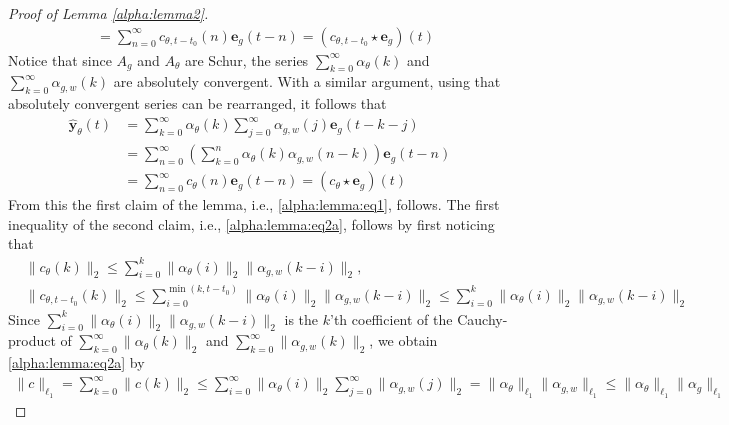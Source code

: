 \documentclass{article}
\newcommand{\e}{\mathbf{e}}
\newcommand{\y}{\mathbf{y}}
\begin{document}
\begin{proof}[Proof of Lemma  \ref{alpha:lemma2}]
\begin{align*}
      &=\sum_{n=0}^{\infty} c_{\theta, t-t_0}(n)\e_g(t-n)=(c_{\theta, t-t_0} \star \e_g)(t)
  \end{align*}
  Notice that since $A_g$ and $A_{\theta}$ are Schur, the series 
  $\sum_{k=0}^{\infty} \alpha_{\theta}(k)$ and $\sum_{k=0}^{\infty} \alpha_{g,w}(k)$ are absolutely convergent. 
  With a similar argument, using that absolutely convergent series can be rearranged, it follows that
  \begin{align*}
     \hat{\y}_{\theta}(t)
     &=\sum_{k=0}^{\infty} \alpha_{\theta}(k)\sum_{j=0}^{\infty} \alpha_{g,w}(j)\e_g(t-k-j)\\
      &= \sum_{n=0}^{\infty } \left(\sum_{k=0}^{n} \alpha_{\theta}(k)\alpha_{g,w}(n-k)\right)\e_g(t-n)\\
      &=
      \sum_{n=0}^{\infty} c_{\theta}(n)\e_g(t-n)=(c_{\theta} \star \e_g)(t)
  \end{align*}
  From this the first  claim of the lemma, i.e., \eqref{alpha:lemma:eq1}, follows.
  The first inequality of the second claim, i.e., 
  \eqref{alpha:lemma:eq2a}, follows
  by first noticing that 
  \begin{align*}
    & \|c_{\theta}(k) \|_2 \le \sum_{i=0}^{k} \|\alpha_{\theta}(i)\|_2 \|\alpha_{g,w}(k-i)\|_2, \\
     & \|c_{\theta,t-t_0}(k) \|_2 \le \sum_{i=0}^{\min(k,t-t_0)} \|\alpha_{\theta}(i)\|_2 \|\alpha_{g,w}(k-i)\|_2 
     \le \sum_{i=0}^{k} \|\alpha_{\theta}(i)\|_2 \|\alpha_{g,w}(k-i)\|_2
  \end{align*}
  Since $\sum_{i=0}^{k} \|\alpha_{\theta}(i)\|_2 \|\alpha_{g,w}(k-i)\|_2$ is the  $k$'th coefficient of the Cauchy-product of 
  $\sum_{k=0}^{\infty} \|\alpha_{\theta}(k)\|_2$ and $\sum_{k=0}^{\infty} \|\alpha_{g,w}(k)\|_2$, we obtain  \eqref{alpha:lemma:eq2a} by  
    \begin{align}\label{alpha:lemma2:pf2}
      \|c\|_{\ell_1}=\sum_{k=0}^{\infty}\|c(k)\|_2
  \le \sum_{i=0}^{\infty} \|\alpha_{\theta}(i)\|_2 \sum_{j=0}^{\infty} \|\alpha_{g,w}(j)\|_2    
      =\|\alpha_{\theta}\|_{\ell_1} \|\alpha_{g,w}\|_{\ell_1}
       \leq\|\alpha_{\theta}\|_{\ell_1} \|\alpha_{g}\|_{\ell_1}
  \end{align}

\end{proof}
\end{document}
